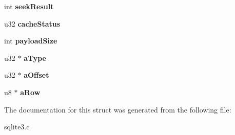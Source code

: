 \begin{DoxyCompactItemize}
\item 
\hypertarget{struct_vdbe_cursor_a5eff86e2a9c87dc15956ad362aa03f05}{int {\bfseries seek\-Result}}\label{struct_vdbe_cursor_a5eff86e2a9c87dc15956ad362aa03f05}

\item 
\hypertarget{struct_vdbe_cursor_acf243b5a94a6e5a11341d6fece473c00}{u32 {\bfseries cache\-Status}}\label{struct_vdbe_cursor_acf243b5a94a6e5a11341d6fece473c00}

\item 
\hypertarget{struct_vdbe_cursor_a5c1fa124d7f27a30e14ef0f455955cab}{int {\bfseries payload\-Size}}\label{struct_vdbe_cursor_a5c1fa124d7f27a30e14ef0f455955cab}

\item 
\hypertarget{struct_vdbe_cursor_a6992d2bf9eb8480985aec47dae58f1ab}{u32 $\ast$ {\bfseries a\-Type}}\label{struct_vdbe_cursor_a6992d2bf9eb8480985aec47dae58f1ab}

\item 
\hypertarget{struct_vdbe_cursor_a17431e67b341282aeb6c026cd01ec1e9}{u32 $\ast$ {\bfseries a\-Offset}}\label{struct_vdbe_cursor_a17431e67b341282aeb6c026cd01ec1e9}

\item 
\hypertarget{struct_vdbe_cursor_a6bd10979ffb5d4828967eea1d6e0d2c8}{u8 $\ast$ {\bfseries a\-Row}}\label{struct_vdbe_cursor_a6bd10979ffb5d4828967eea1d6e0d2c8}

\end{DoxyCompactItemize}


The documentation for this struct was generated from the following file\-:\begin{DoxyCompactItemize}
\item 
sqlite3.\-c\end{DoxyCompactItemize}
